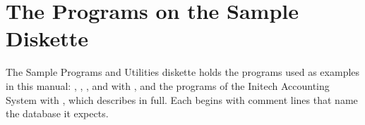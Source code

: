 \section{The Programs on the Sample Diskette}
The Sample Programs and Utilities diskette holds the programs used as examples
in this manual: , , ,
 and  with , and the programs of
the Initech Accounting System with , which
 describes in full.  Each begins with
comment lines that name the database it expects.
